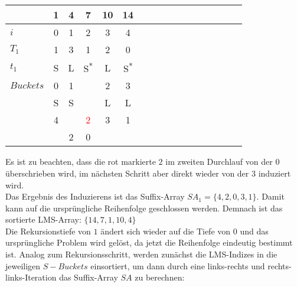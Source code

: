 \begin{center}
  \begin{tabular}{ | l | c | c | c | c | c | c | c | c | c | c | c | c | c | c | c | c | }
    \hline
          & \tiny{1} & \tiny{4} & \tiny{7} & \tiny{10} & \tiny{14} \\ \hline
      $i$ & 0 & 1 & 2 & 3 & 4  \\ \hline
    $T_1$ & 1 & 3 & 1 & 2 & 0  \\ \hline
      $t_1$ & S & L & S\textsuperscript{*} & L & S\textsuperscript{*}  \\ \hline
$Buckets$ & 0 & \multicolumn{1}{c}{1} & & 2 & 3 \\ \hline
          & S & \multicolumn{1}{c}{S} & & L & L \\ \hline
          & 4 & & \textcolor{red}{2} & 3 & 1 \\ \hline
          & & 2 & 0 & & \\
    \hline
  \end{tabular}
\end{center}
\bigskip

\noindent Es ist zu beachten, dass die rot markierte $2$ im zweiten Durchlauf von der $0$ überschrieben wird, im nächsten Schritt aber direkt wieder von der $3$ induziert wird. \\
Das Ergebnis des Induzierens ist das Suffix-Array $SA_1 = \{4, 2, 0, 3, 1\}$. Damit kann auf die ursprüngliche Reihenfolge geschlossen werden. Demnach ist das sortierte LMS-Array: $\{14, 7, 1, 10, 4\}$ \\
Die Rekursionstiefe von $1$ ändert sich wieder auf die Tiefe von $0$ und das ursprüngliche Problem wird gelöst, da jetzt die Reihenfolge eindeutig bestimmt ist. Analog zum Rekursionsschritt, werden zunächst die LMS-Indizes in die jeweiligen $S-Buckets$ einsortiert, um dann durch eine links-rechts und rechts-links-Iteration das Suffix-Array $SA$ zu berechnen:

